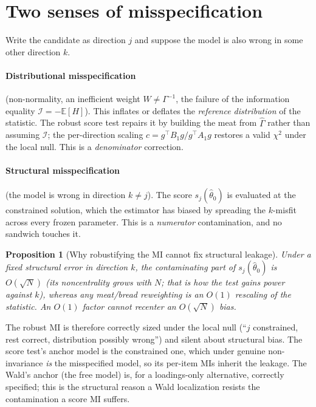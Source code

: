 \documentclass[11pt]{article}
\newcommand{\E}{\mathbb{E}}
\newcommand{\Th}{\hat\theta}
\theoremstyle{plain}
\newtheorem{proposition}{Proposition}
\theoremstyle{remark}
\begin{document}
\section{Two senses of misspecification}

Write the candidate as direction $j$ and suppose the model is also wrong in some
other direction $k$.

\paragraph{Distributional misspecification} (non-normality, an inefficient
weight $W \neq \Gamma^{-1}$, the failure of the information equality
$\mathcal{I} = -\E[H]$). This inflates or deflates the \emph{reference
distribution} of the statistic. The robust score test repairs it by building the
meat from $\hat\Gamma$ rather than assuming $\mathcal{I}$; the per-direction
scaling $c = g^\top B_1 g / g^\top A_1 g$ restores a valid $\chi^2$ under the
local null. This is a \emph{denominator} correction.

\paragraph{Structural misspecification} (the model is wrong in direction $k \neq
j$). The score $s_j(\Th_0)$ is evaluated at the constrained solution, which the
estimator has biased by spreading the $k$-misfit across every frozen parameter.
This is a \emph{numerator} contamination, and no sandwich touches it.

\begin{proposition}[Why robustifying the MI cannot fix structural leakage]
Under a fixed structural error in direction $k$, the contaminating part of
$s_j(\Th_0)$ is $O(\sqrt{N})$ (its noncentrality grows with $N$; that is how the
test gains power against $k$), whereas any meat/bread reweighting is an $O(1)$
rescaling of the statistic. An $O(1)$ factor cannot recenter an $O(\sqrt{N})$
bias.
\end{proposition}

The robust MI is therefore correctly sized under the local null
(``$j$ constrained, rest correct, distribution possibly wrong'') and silent
about structural bias. The score test's anchor model is the constrained one,
which under genuine non-invariance \emph{is} the misspecified model, so its
per-item MIs inherit the leakage. The Wald's anchor (the free model) is, for a
loadings-only alternative, correctly specified; this is the structural reason a
Wald localization resists the contamination a score MI suffers.
\end{document}
